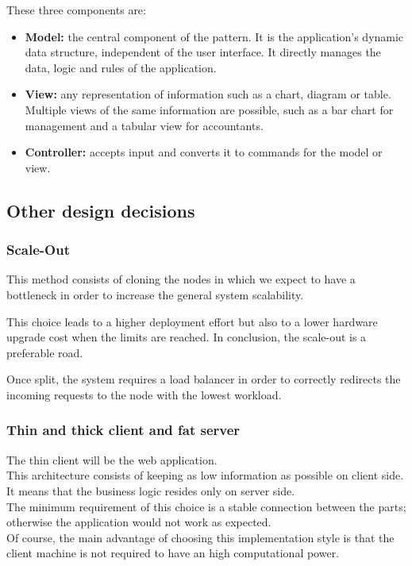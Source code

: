 These three components are:
\begin{itemize}
    \item \textbf{Model:} the central component of the pattern. It is the application's dynamic data structure, independent of the user interface. It directly manages the data, logic and rules of the application.
    \item \textbf{View:} any representation of information such as a chart, diagram or table. Multiple views of the same information are possible, such as a bar chart for management and a tabular view for accountants.
    \item \textbf{Controller:} accepts input and converts it to commands for the model or view.
\end{itemize}

\subsection{Other design decisions}
\subsubsection{Scale-Out}
This method consists of cloning the nodes in which we expect to have a bottleneck in order to increase the general system scalability.

This choice leads to a higher deployment effort but also to a lower hardware upgrade cost when the limits are reached. In conclusion, the scale-out is a preferable road.

Once split, the system requires a load balancer in order to correctly redirects the incoming requests to the node with the lowest workload.

\subsubsection{Thin and thick client and fat server}
The thin client will be the web application.\\
This architecture consists of keeping as low information as possible on client side. It means that the business logic resides only on server side.\\
The minimum requirement of this choice is a stable connection between the parts; otherwise the application would not work as expected.\\
Of course, the main advantage of choosing this implementation style is that the client machine is not required to have an high computational power.

